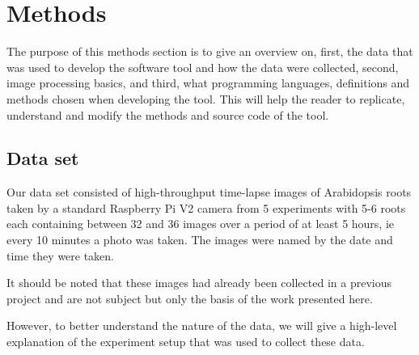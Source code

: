 
\chapter{Methods} %

\label{methods} %

%

The purpose of this methods section is to give an overview on, first, the data that was used to develop the software tool and how the data were collected, second, image processing basics, and third, what programming languages, definitions and methods chosen when developing the tool. This will help the reader to replicate, understand and modify the methods and source code of the tool. 

\section{Data set}

Our data set consisted of high-throughput time-lapse images of Arabidopsis roots taken by a standard Raspberry Pi V2 camera from 5 experiments with 5-6 roots each containing between 32 and 36 images over a period of at least 5 hours, ie every 10 minutes a photo was taken. The images were named by the date and time they were taken. 

It should be noted that these images had already been collected in a previous project and are not subject but only the basis of the work presented here. 

However, to better understand the nature of the data, we will give a high-level explanation of the experiment setup that was used to collect these data.


